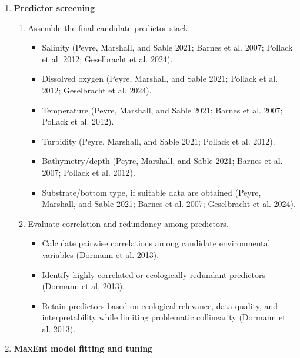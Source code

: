 \documentclass[
  letterpaper,
  DIV=11,
  numbers=noendperiod]{scrartcl}
\providecommand{\tightlist}{%
  \setlength{\itemsep}{0pt}\setlength{\parskip}{0pt}}
\begin{document}
\begin{enumerate}
\begin{enumerate}
    \begin{itemize}
    \tightlist
    \item
      Evaluate whether spatial thinning, bias weighting, or restricted
      background sampling is necessary (Phillips et al. 2009).
    \end{itemize}
  \end{enumerate}
\item
  \textbf{Predictor screening}

  \begin{enumerate}
  \def\labelenumii{\arabic{enumii}.}
  \tightlist
  \item
    Assemble the final candidate predictor stack.

    \begin{itemize}
    \tightlist
    \item
      Salinity (Peyre, Marshall, and Sable 2021; Barnes et al. 2007;
      Pollack et al. 2012; Geselbracht et al. 2024).
    \item
      Dissolved oxygen (Peyre, Marshall, and Sable 2021; Pollack et al.
      2012; Geselbracht et al. 2024).
    \item
      Temperature (Peyre, Marshall, and Sable 2021; Barnes et al. 2007;
      Pollack et al. 2012).
    \item
      Turbidity (Peyre, Marshall, and Sable 2021; Pollack et al. 2012).
    \item
      Bathymetry/depth (Peyre, Marshall, and Sable 2021; Barnes et al.
      2007; Pollack et al. 2012).
    \item
      Substrate/bottom type, if suitable data are obtained (Peyre,
      Marshall, and Sable 2021; Barnes et al. 2007; Geselbracht et al.
      2024).
    \end{itemize}
  \item
    Evaluate correlation and redundancy among predictors.

    \begin{itemize}
    \tightlist
    \item
      Calculate pairwise correlations among candidate environmental
      variables (Dormann et al. 2013).
    \item
      Identify highly correlated or ecologically redundant predictors
      (Dormann et al. 2013).
    \item
      Retain predictors based on ecological relevance, data quality, and
      interpretability while limiting problematic collinearity (Dormann
      et al. 2013).
    \end{itemize}
  \end{enumerate}
\item
  \textbf{MaxEnt model fitting and tuning}


\end{enumerate}
\end{document}

